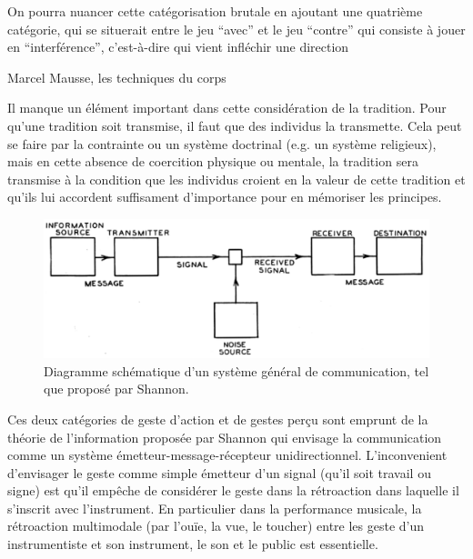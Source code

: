 On pourra nuancer cette catégorisation brutale en ajoutant une quatrième catégorie, qui se situerait entre 
le jeu ``avec'' et le jeu ``contre'' qui consiste à jouer en ``interférence'', c'est-à-dire qui vient infléchir une direction


 Marcel Mausse, les techniques du corps

Il manque un élément important dans cette considération de la tradition. Pour qu'une tradition soit transmise, il faut que des individus la transmette. Cela peut se faire par la contrainte ou un système doctrinal (e.g. un système religieux), mais en cette absence de coercition physique ou mentale, la tradition sera transmise à la condition que les individus croient en la valeur de cette tradition et qu'ils lui accordent suffisament d'importance pour en mémoriser les principes.


\begin{figure}[!htbp]
	\includegraphics[width=\textwidth]{gfx/03_gesture/ShannonCommunicationSystem.png}
	\caption{Diagramme schématique d'un système général de communication, tel que proposé par Shannon.}
	\label{fig:gesture:shannon}
\end{figure}



Ces deux catégories de geste d'action et de gestes perçu sont emprunt de la théorie de l'information proposée par Shannon \cite{shannon_mathematical_1948} qui envisage la communication comme un système émetteur-message-récepteur unidirectionnel. 
L'inconvenient d'envisager le geste comme simple émetteur d'un signal (qu'il soit travail ou signe) est qu'il empêche de considérer le geste dans la rétroaction dans laquelle il s'inscrit avec l'instrument. En particulier dans la performance musicale, la rétroaction multimodale (par l'ouïe, la vue, le toucher) entre les geste d'un instrumentiste et son instrument, le son et le public est essentielle.

